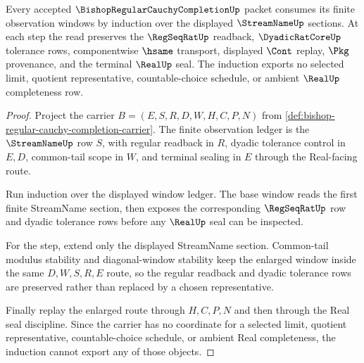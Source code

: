 \begin{theorem}
\label{thm:regular-cauchy-completion-finite-window-induction}
Every accepted $\BishopRegularCauchyCompletionUp$ packet consumes its finite observation windows by induction over the displayed $\StreamNameUp$ sections. At each step the read preserves the $\RegSeqRatUp$ readback, $\DyadicRatCoreUp$ tolerance rows, componentwise $\hsame$ transport, displayed $\Cont$ replay, $\Pkg$ provenance, and the terminal $\RealUp$ seal. The induction exports no selected limit, quotient representative, countable-choice schedule, or ambient $\RealUp$ completeness row.
\end{theorem}
\begin{proof}
Project the carrier $B=(E,S,R,D,W,H,C,P,N)$ from \autoref{def:bishop-regular-cauchy-completion-carrier}. The finite observation ledger is the $\StreamNameUp$ row $S$, with regular readback in $R$, dyadic tolerance control in $E,D$, common-tail scope in $W$, and terminal sealing in $E$ through the Real-facing route.

Run induction over the displayed window ledger. The base window reads the first finite StreamName section, then exposes the corresponding $\RegSeqRatUp$ row and dyadic tolerance rows before any $\RealUp$ seal can be inspected.

For the step, extend only the displayed StreamName section. Common-tail modulus stability and diagonal-window stability keep the enlarged window inside the same $D,W,S,R,E$ route, so the regular readback and dyadic tolerance rows are preserved rather than replaced by a chosen representative.

Finally replay the enlarged route through $H,C,P,N$ and then through the Real seal discipline. Since the carrier has no coordinate for a selected limit, quotient representative, countable-choice schedule, or ambient Real completeness, the induction cannot export any of those objects.
\end{proof}

